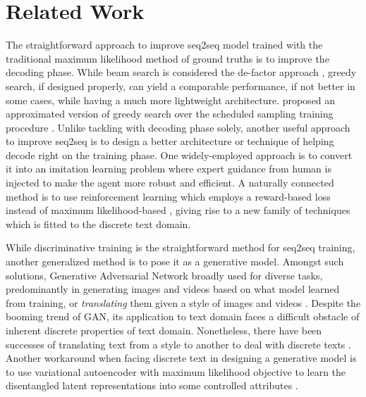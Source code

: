 \documentclass[11pt,a4paper]{article}
\begin{document}
\section{Related Work} \label{sec:related_work}%
The straightforward approach to improve seq2seq model trained with the traditional maximum likelihood method  of ground truths is to improve the decoding phase. While beam search is considered the de-factor approach \cite{seq2seq_2014}, greedy search, if designed properly, can yield a comparable performance, if not better in some cases, while having a much more lightweight architecture. \citet{goyal2017differentiable} proposed an approximated version of greedy search over the scheduled sampling training procedure \cite{bengio2015scheduled}. 
Unlike tackling with decoding phase solely, another useful approach to improve seq2seq is to design a better architecture or technique of helping decode right on the training phase. One widely-employed approach is to 
convert it into an imitation learning problem \cite{daume2009search,ross2011reduction,bengio2015scheduled} where expert guidance from human is injected to make the agent more robust and efficient. 
A naturally connected method is to use reinforcement learning \cite{sutton1998reinforcement} which employs a reward-based loss instead of maximum likelihood-based \cite{ranzato2015sequence, gu2017learning}, giving rise to a new family of techniques which is fitted to the discrete text domain. 

While discriminative training is the straightforward method for seq2seq training, another generalized method is to pose it as a generative model. Amongst such solutions, Generative Adversarial Network \cite{goodfellow2014generative} broadly used for diverse tasks, predominantly in generating images \cite{dcgan2015,berthelot2017began,zhang2017stackgan,progressive_gan_2017,li2017mmd} and videos \cite{vondrick2016generating} based on what model learned from training, or \textit{translating} them given a style of images \cite{conditional_gan_2014,pix2pix2017,discoGAN2017,mechrez2017photorealistic,luan2017deep,zhu2017unpaired,ma2018gan} and videos \cite{ruder2016artistic,liu2017unsupervised}. Despite the booming trend of GAN, its application to text domain faces a difficult obstacle of inherent discrete properties of text domain. Nonetheless, there have been successes of translating text from a style to another 
to deal with discrete texts \cite{boundaryseeking_gan_2017,yu2017seqgan,shen2017style}.  
Another workaround when facing discrete text in designing a generative model is to use variational autoencoder \cite{kingma2013auto} with maximum likelihood objective to learn the disentangled latent representations into some controlled attributes \cite{controlled_text_gen_2017}. 
\end{document}

